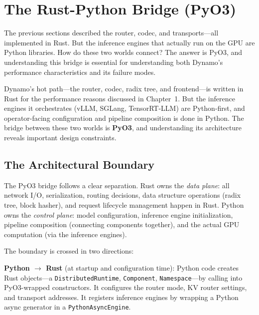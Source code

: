 \section{The Rust-Python Bridge (PyO3)}
\label{sec:architecture:pyo3}

The previous sections described the router, codec, and transports---all implemented in Rust. But the inference engines that actually run on the GPU are Python libraries. How do these two worlds connect? The answer is PyO3, and understanding this bridge is essential for understanding both Dynamo's performance characteristics and its failure modes.

%
Dynamo's hot path---the router, codec, radix tree, and frontend---is written in Rust for the performance reasons discussed in Chapter~1. But the inference engines it orchestrates (vLLM, SGLang, TensorRT-LLM) are Python-first, and operator-facing configuration and pipeline composition is done in Python. The bridge between these two worlds is \textbf{PyO3}, and understanding its architecture reveals important design constraints.

\subsection{The Architectural Boundary}

The PyO3 bridge follows a clear separation. Rust owns the \emph{data plane}: all network I/O, serialization, routing decisions, data structure operations (radix tree, block hasher), and request lifecycle management happen in Rust. Python owns the \emph{control plane}: model configuration, inference engine initialization, pipeline composition (connecting components together), and the actual GPU computation (via the inference engines).

The boundary is crossed in two directions:

\textbf{Python $\rightarrow$ Rust} (at startup and configuration time): Python code creates Rust objects---a \texttt{DistributedRuntime}, \texttt{Component}, \texttt{Namespace}---by calling into PyO3-wrapped constructors. It configures the router mode, KV router settings, and transport addresses. It registers inference engines by wrapping a Python async generator in a \texttt{PythonAsyncEngine}.

